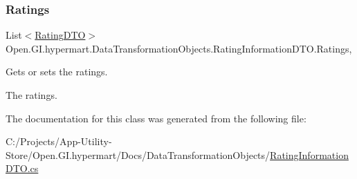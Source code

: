 \subsubsection{\texorpdfstring{Ratings}{Ratings}}
{\footnotesize\ttfamily List$<$\hyperlink{class_open_1_1_g_i_1_1hypermart_1_1_data_transformation_objects_1_1_rating_d_t_o}{Rating\+D\+TO}$>$ Open.\+G\+I.\+hypermart.\+Data\+Transformation\+Objects.\+Rating\+Information\+D\+T\+O.\+Ratings\hspace{0.3cm}{\ttfamily [get]}, {\ttfamily [set]}}



Gets or sets the ratings. 

The ratings. 

The documentation for this class was generated from the following file\+:\begin{DoxyCompactItemize}
\item 
C\+:/\+Projects/\+App-\/\+Utility-\/\+Store/\+Open.\+G\+I.\+hypermart/\+Docs/\+Data\+Transformation\+Objects/\hyperlink{_rating_information_d_t_o_8cs}{Rating\+Information\+D\+T\+O.\+cs}\end{DoxyCompactItemize}
